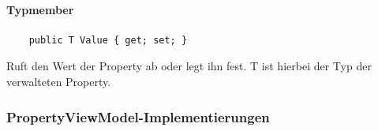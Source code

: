 \paragraph{Typmember}
\begin{itemize}

	\begin{verbatim}
	public T Value { get; set; }
	\end{verbatim}
	Ruft den Wert der Property ab oder legt ihn fest. T ist hierbei der Typ der verwalteten Property.
\end{itemize}



\subsubsection{PropertyViewModel-Implementierungen}

